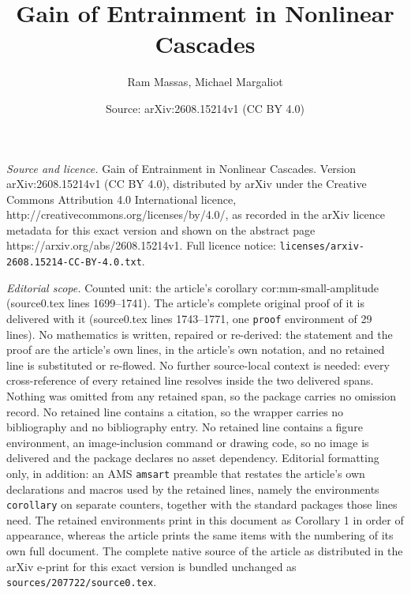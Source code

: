 \documentclass[10pt,a4paper]{amsart}
\title{Gain of Entrainment in Nonlinear Cascades}
\author{Ram Massas, Michael Margaliot}
\date{Source: arXiv:2608.15214v1 (CC BY 4.0)}
\begin{document}
\maketitle

\noindent\emph{Source and licence.} Gain of Entrainment in Nonlinear Cascades. Version arXiv:2608.15214v1 (CC BY 4.0), distributed by arXiv under the Creative Commons Attribution 4.0 International licence, http://creativecommons.org/licenses/by/4.0/, as recorded in the arXiv licence metadata for this exact version and shown on the abstract page https://arxiv.org/abs/2608.15214v1. Full licence notice: \texttt{licenses/arxiv-2608.15214-CC-BY-4.0.txt}.\par\smallskip

\noindent\textit{Editorial scope.} Counted unit: the article's corollary cor:mm-small-amplitude (source0.tex lines 1699--1741). The article's complete original proof of it is delivered with it (source0.tex lines 1743--1771, one \texttt{proof} environment of 29 lines). No mathematics is written, repaired or re-derived: the statement and the proof are the article's own lines, in the article's own notation, and no retained line is substituted or re-flowed.  No further source-local context is needed: every cross-reference of every retained line resolves inside the two delivered spans.  Nothing was omitted from any retained span, so the package carries no omission record.  No retained line contains a citation, so the wrapper carries no bibliography and no bibliography entry.  No retained line contains a figure environment, an image-inclusion command or drawing code, so no image is delivered and the package declares no asset dependency.  Editorial formatting only, in addition: an AMS \texttt{amsart} preamble that restates the article's own declarations and macros used by the retained lines, namely the environments \texttt{corollary} on separate counters, together with the standard packages those lines need.  The retained environments print in this document as Corollary 1 in order of appearance, whereas the article prints the same items with the numbering of its own full document.  The complete native source of the article as distributed in the arXiv e-print for this exact version is bundled unchanged as \texttt{sources/207722/source0.tex}.
\end{document}
